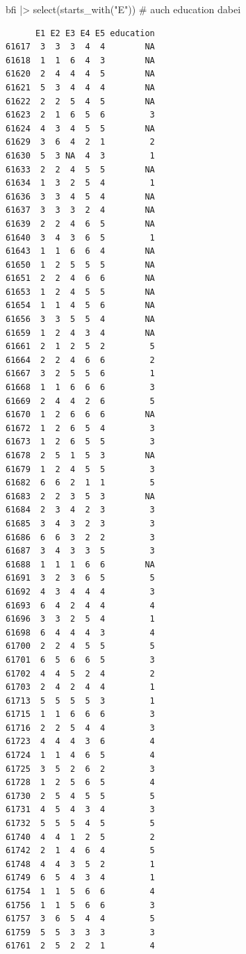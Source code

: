 \documentclass[
  letterpaper,
  DIV=11,
  numbers=noendperiod]{scrreprt}
\newenvironment{Shaded}{\begin{snugshade}}{\end{snugshade}}
\newcommand{\CommentTok}[1]{\textcolor[rgb]{0.37,0.37,0.37}{#1}}
\newcommand{\FunctionTok}[1]{\textcolor[rgb]{0.28,0.35,0.67}{#1}}
\newcommand{\NormalTok}[1]{\textcolor[rgb]{0.00,0.23,0.31}{#1}}
\newcommand{\SpecialCharTok}[1]{\textcolor[rgb]{0.37,0.37,0.37}{#1}}
\newcommand{\StringTok}[1]{\textcolor[rgb]{0.13,0.47,0.30}{#1}}
\begin{document}
\begin{Shaded}
\begin{Highlighting}[]
\NormalTok{bfi }\SpecialCharTok{|\textgreater{}} \FunctionTok{select}\NormalTok{(}\FunctionTok{starts\_with}\NormalTok{(}\StringTok{"E"}\NormalTok{)) }\CommentTok{\# auch education dabei}
\end{Highlighting}
\end{Shaded}

\begin{verbatim}
      E1 E2 E3 E4 E5 education
61617  3  3  3  4  4        NA
61618  1  1  6  4  3        NA
61620  2  4  4  4  5        NA
61621  5  3  4  4  4        NA
61622  2  2  5  4  5        NA
61623  2  1  6  5  6         3
61624  4  3  4  5  5        NA
61629  3  6  4  2  1         2
61630  5  3 NA  4  3         1
61633  2  2  4  5  5        NA
61634  1  3  2  5  4         1
61636  3  3  4  5  4        NA
61637  3  3  3  2  4        NA
61639  2  2  4  6  5        NA
61640  3  4  3  6  5         1
61643  1  1  6  6  4        NA
61650  1  2  5  5  5        NA
61651  2  2  4  6  6        NA
61653  1  2  4  5  5        NA
61654  1  1  4  5  6        NA
61656  3  3  5  5  4        NA
61659  1  2  4  3  4        NA
61661  2  1  2  5  2         5
61664  2  2  4  6  6         2
61667  3  2  5  5  6         1
61668  1  1  6  6  6         3
61669  2  4  4  2  6         5
61670  1  2  6  6  6        NA
61672  1  2  6  5  4         3
61673  1  2  6  5  5         3
61678  2  5  1  5  3        NA
61679  1  2  4  5  5         3
61682  6  6  2  1  1         5
61683  2  2  3  5  3        NA
61684  2  3  4  2  3         3
61685  3  4  3  2  3         3
61686  6  6  3  2  2         3
61687  3  4  3  3  5         3
61688  1  1  1  6  6        NA
61691  3  2  3  6  5         5
61692  4  3  4  4  4         3
61693  6  4  2  4  4         4
61696  3  3  2  5  4         1
61698  6  4  4  4  3         4
61700  2  2  4  5  5         5
61701  6  5  6  6  5         3
61702  4  4  5  2  4         2
61703  2  4  2  4  4         1
61713  5  5  5  5  3         1
61715  1  1  6  6  6         3
61716  2  2  5  4  4         3
61723  4  4  4  3  6         4
61724  1  1  4  6  5         4
61725  3  5  2  6  2         3
61728  1  2  5  6  5         4
61730  2  5  4  5  5         5
61731  4  5  4  3  4         3
61732  5  5  5  4  5         5
61740  4  4  1  2  5         2
61742  2  1  4  6  4         5
61748  4  4  3  5  2         1
61749  6  5  4  3  4         1
61754  1  1  5  6  6         4
61756  1  1  5  6  6         3
61757  3  6  5  4  4         5
61759  5  5  3  3  3         3
61761  2  5  2  2  1         4

\end{verbatim}
\end{document}
